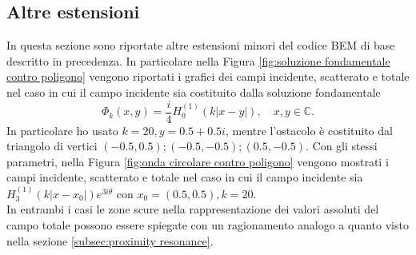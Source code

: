 \documentclass[a4paper,12pt]{article}
\theoremstyle{definition}
\begin{document}
\subsection{Altre estensioni}
\label{subsec:altre estensioni}
In questa sezione sono riportate altre estensioni minori del codice BEM di base descritto in precedenza. In particolare nella Figura \ref{fig:soluzione fondamentale contro poligono} vengono riportati i grafici dei campi incidente, scatterato e totale nel caso in cui il campo incidente sia costituito dalla soluzione fondamentale 
\begin{equation*}
    \Phi_k(x, y) = \frac{i}{4}H_0^{(1)}(k|x-y|), \quad x, y \in \mathbb{C}.
\end{equation*}
In particolare ho usato $k=20, y = 0.5+0.5i$, mentre l'ostacolo è costituito dal triangolo di vertici $(-0.5, 0.5); (-0.5, -0.5); (0.5, -0.5)$.
Con gli stessi parametri, nella Figura \ref{fig:onda circolare contro poligono} vengono mostrati i campi incidente, scatterato e totale nel caso in cui il campo incidente sia $H_3^{(1)}(k|x-x_0|)e^{3i\theta}$ con $x_0 = (0.5, 0.5), k=20$.\\
In entrambi i casi le zone scure nella rappresentazione dei valori assoluti del campo totale possono essere spiegate con un ragionamento analogo a quanto visto nella sezione \ref{subsec:proximity resonance}.
\end{document}
